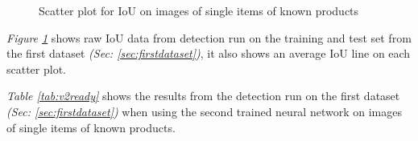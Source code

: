 \begin{figure}[h]
 \hfill
 \caption{Scatter plot for IoU on images of single items of known products} %
 \label{figure: v2knownproducts}
\end{figure}
\textit{Figure \ref{figure: v2knownproducts}} shows raw IoU data from detection run on the training and test set from the first dataset \textit{(Sec: \ref{sec:firstdataset})}, it also shows an average IoU line on each scatter plot.

\begin{table}[h]
\caption{Detection results when tested on trained data using the second neural network}
\label{tab:v2ready}
\end{table}
\textit{Table \ref{tab:v2ready}} shows the results from the detection run on the first dataset \textit{(Sec: \ref{sec:firstdataset})} when using the second trained neural network on images of single items of known products.

